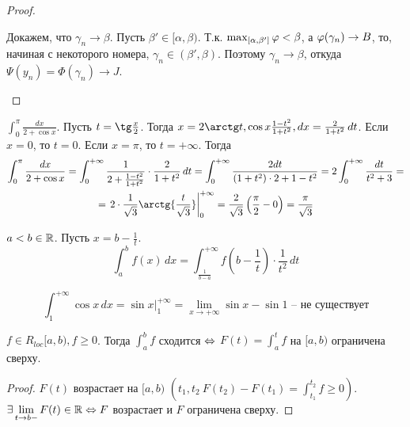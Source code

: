 \begin{MyList}
\begin{proof}
\begin{MyList}
			Докажем, что $\gamma_n \to \beta$. Пусть $\beta' \in [\alpha, \beta)$. Т.к. $\max_{[\alpha, \beta']} \varphi < \beta$, а
			$\varphi(\gamma_n) \to B$, то, начиная с некоторого номера, $\gamma_n \in (\beta', \beta)$. Поэтому $\gamma_n \to \beta$, откуда $\Psi(y_n) = \Phi(\gamma_n) \to J$.     
		\end{MyList}
	\end{proof}

	\begin{Example}
		$\int_0^\pi \frac{dx}{2 + \cos x}$. Пусть $t = \tg \frac{x}{2}$. Тогда $x = 2 \arctg t, \cos x \frac{1 - t^2}{1 + t^2}, dx = \frac{2}{1 + t^2}\,dt$. 
		Если $x = 0$, то $t = 0$. Если $x = \pi$, то $t = +\infty$. Тогда
		\begin{gather*}
		\int_0^\pi \frac{dx}{2 + \cos x} = \int_0^{+\infty} \frac{1}{2 + \frac{1 - t^2}{1 + t^2}} \cdot \frac{2}{1 + t^2}\,dt = \int_0^{+\infty} \frac{2dt}{(1 + t^2) \cdot 2 + 1 - t^2} = 2 \int_0^{+\infty} \frac{dt}{t^2 + 3} = \\
		=  \left.2 \cdot \frac{1}{\sqrt{3}} \arctg{\frac{t}{\sqrt{3}}}\right|_0^{+\infty} = \frac{2}{\sqrt{3}}\left(\frac{\pi}{2} - 0\right) = \frac{\pi}{\sqrt{3}}
		\end{gather*}
	\end{Example}

	\begin{Rem}
		$a < b \in \mathbb{R}$. Пусть $x = b - \frac{1}{t}$.
		\[\int_a^b f(x) \,dx = \int_{\frac{1}{b - a}}^{+\infty} f\left(b - \frac{1}{t}\right)\cdot \frac{1}{t^2}\,dt\]
	\end{Rem}

	\begin{Example}
		\[\int_1^{+\infty} \cos x \,dx = \left.\sin x\right|_1^{+\infty} = \lim_{x \to +\infty} \sin x - \sin 1 \textrm{ -- не существует}\]
	\end{Example}
\end{MyList}



\begin{Lm}
	$f \in R_{loc} [a, b), f \geqslant 0$. Тогда $\int_a^b f$ сходится $\Leftrightarrow$ $F(t) = \int_a^t f$ на $[a, b)$ ограничена сверху. 
\end{Lm}

\begin{proof}
	$F(t)$ возрастает на $[a, b)$ $\left(t_1, t_2 \ F(t_2) - F(t_1) = \int_{t_1}^{t_2} f \geqslant 0\right)$.
	$\displaystyle{\exists \lim_{t \to b-} F(t) \in \mathbb{R}\Leftrightarrow F}$ возрастает и $F$ ограничена сверху. 
\end{proof}

